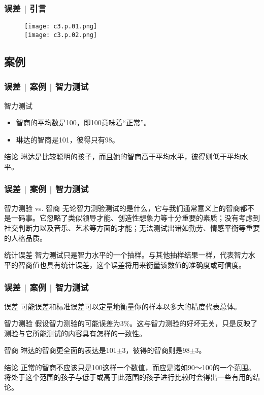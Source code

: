 \begin{frame}
  \frametitle{误差 | 引言}
  \begin{figure}
    \centering
    \texttt{[image: c3.p.01.png]}\\
    \texttt{[image: c3.p.02.png]}
  \end{figure}
\end{frame}

\subsection{案例}
\begin{frame}
  \frametitle{误差 | 案例 | 智力测试}
  \begin{block}{智力测试}
    \begin{itemize}
      \item 智商的平均数是100，即100意味着“正常”。
      \item 琳达的智商是101，彼得只有98。
    \end{itemize}
  \end{block}
  \pause
  \begin{block}{结论}
    琳达是比较聪明的孩子，而且她的智商高于平均水平，彼得则低于平均水平。
  \end{block}
\end{frame}

\begin{frame}
  \frametitle{误差 | 案例 | 智力测试}
  \begin{block}{智力测验 vs. 智商}
    无论智力测验测试的是什么，它与我们通常意义上的智商都不是一码事。它忽略了类似领导才能、创造性想象力等十分重要的素质；没有考虑到社交判断力以及音乐、艺术等方面的才能；无法测试出诸如勤劳、情感平衡等重要的人格品质。
  \end{block}
  \pause
  \begin{block}{统计误差}
    智力测试只是智力水平的一个抽样。与其他抽样结果一样，代表智力水平的智商值也具有统计误差，这个误差将用来衡量该数值的准确度或可信度。
  \end{block}
\end{frame}

\begin{frame}
  \frametitle{误差 | 案例 | 智力测试}
  \begin{block}{误差}
    可能误差和标准误差可以定量地衡量你的样本以多大的精度代表总体。
  \end{block}
  \pause
  \begin{block}{智力测验}
    假设智力测验的可能误差为3\%。这与智力测验的好坏无关，只是反映了测验与它所能测试的内容具有怎样的一致性。
  \end{block}
  \pause
  \begin{block}{智商}
    琳达的智商更全面的表达是101$\pm$3，彼得的智商则是98$\pm$3。
  \end{block}
  \pause
  \begin{block}{结论}
    正常的智商不应该只是100这样一个数值，而应是诸如90～100的一个范围。将处于这个范围的孩子与低于或高于此范围的孩子进行比较时会得出一些有用的结论。
  \end{block}
\end{frame}


